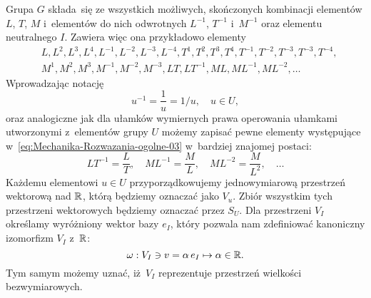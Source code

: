 \documentclass[a4paper,11pt]{article}
\begin{document}
Grupa $G$ składa~się ze wszystkich możliwych, skończonych kombinacji
elementów $L$, $T$, $M$ i~elementów do nich odwrotnych $L^{ -1 }$, $T^{ -1 }$
i~$M^{ -1 }$ oraz elementu neutralnego $I$. Zawiera więc ona przykładowo
elementy
\begin{equation}
  \label{eq:Mechanika-Rozwazania-ogolne-03}
  \begin{split}
    &L, L^{ 2 }, L^{ 3 }, L^{ 4 }, L^{ -1 }, L^{ -2 }, L^{ -3 }, L^{ -4 },
      T^{ 1 }, T^{ 2 }, T^{ 3 }, T^{ 4 }, T^{ -1 }, T^{ -2 }, T^{ -3 },
      T^{ -3 }, T^{ -4 }, \\
    &M^{ 1 }, M^{ 2 }, M^{ 3 }, M^{ -1 }, M^{ -2 }, M^{ -3 },
    L T, L T^{ -1 }, M L, M L^{ -1 }, M L^{ -2 }, \ldots
  \end{split}
\end{equation}
Wprowadzając notację
\begin{equation}
  \label{eq:Mechanika-Rozwazania-ogolne-04}
  u^{ -1 } = \frac{ 1 }{ u } = 1 / u, \quad u \in U,
\end{equation}
oraz analogiczne jak dla ułamków wymiernych prawa operowania ułamkami
utworzonymi z~elementów grupy $U$ możemy zapisać pewne elementy
występujące w~\eqref{eq:Mechanika-Rozwazania-ogolne-03} w~bardziej znajomej
postaci:
\begin{equation}
  \label{eq:Mechanika-Rozwazania-ogolne-05}
  L T^{ -1 } = \frac{ L }{ T }, \quad
  M L^{ -1 } = \frac{ M }{ L }, \quad
  M L^{ -2 } = \frac{ M }{ L^{ 2 } }, \quad \ldots
\end{equation}
Każdemu elementowi $u \in U$ przyporządkowujemy jednowymiarową przestrzeń
wektorową nad $\mathbb{R}$, którą będziemy oznaczać jako $V_{ u }$. Zbiór
wszystkim tych przestrzeni wektorowych będziemy oznaczać przez $S_{ U }$.
Dla przestrzeni $V_{ I }$ określamy wyróżniony wektor bazy $e_{ I }$, który
pozwala nam zdefiniować kanoniczny izomorfizm $V_{ I }$ z~$\mathbb{R}$:
\begin{equation}
  \label{eq:Mechanika-Rozwazania-ogolne-06}
  \omega : V_{ I } \ni v = \alpha \, e_{ I } \mapsto \alpha \in \mathbb{R}.
\end{equation}
Tym samym możemy uznać, iż~$V_{ I }$ reprezentuje przestrzeń wielkości
bezwymiarowych.
\end{document}
